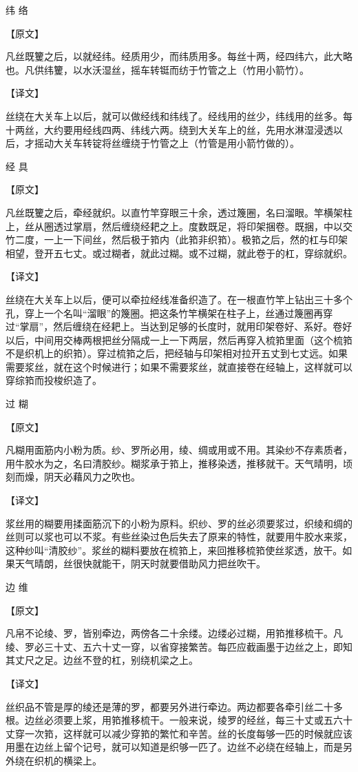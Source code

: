 \documentclass[12pt,UTF8]{ctexbook}
\begin{document}
纬 络

【原文】

凡丝既籰之后，以就经纬。经质用少，而纬质用多。每丝十两，经四纬六，此大略也。凡供纬籰，以水沃湿丝，摇车转铤而纺于竹管之上（竹用小箭竹）。

【译文】

丝绕在大关车上以后，就可以做经线和纬线了。经线用的丝少，纬线用的丝多。每十两丝，大约要用经线四两、纬线六两。绕到大关车上的丝，先用水淋湿浸透以后，才摇动大关车转锭将丝缠绕于竹管之上（竹管是用小箭竹做的）。

经 具

【原文】

凡丝既籰之后，牵经就织。以直竹竿穿眼三十余，透过篾圈，名曰溜眼。竿横架柱上，丝从圈透过掌扇，然后缠绕经耙之上。度数既足，将印架捆卷。既捆，中以交竹二度，一上一下间丝，然后极于筘内（此筘非织筘）。极筘之后，然的杠与印架相望，登开五七丈。或过糊者，就此过糊。或不过糊，就此卷于的杠，穿综就织。

【译文】

丝绕在大关车上以后，便可以牵拉经线准备织造了。在一根直竹竿上钻出三十多个孔，穿上一个名叫“溜眼”的篾圈。把这条竹竿横架在柱子上，丝通过篾圈再穿过“掌扇”，然后缠绕在经耙上。当达到足够的长度时，就用印架卷好、系好。卷好以后，中间用交棒两根把丝分隔成一上一下两层，然后再穿入梳筘里面（这个梳筘不是织机上的织筘）。穿过梳筘之后，把经轴与印架相对拉开五丈到七丈远。如果需要浆丝，就在这个时候进行；如果不需要浆丝，就直接卷在经轴上，这样就可以穿综筘而投梭织造了。

过 糊

【原文】

凡糊用面筋内小粉为质。纱、罗所必用，绫、绸或用或不用。其染纱不存素质者，用牛胶水为之，名曰清胶纱。糊浆承于筘上，推移染透，推移就干。天气晴明，顷刻而燥，阴天必藉风力之吹也。

【译文】

浆丝用的糊要用揉面筋沉下的小粉为原料。织纱、罗的丝必须要浆过，织绫和绸的丝则可以浆也可以不浆。有些丝染过色后失去了原来的特性，就要用牛胶水来浆，这种纱叫“清胶纱”。浆丝的糊料要放在梳筘上，来回推移梳筘使丝浆透，放干。如果天气晴朗，丝很快就能干，阴天时就要借助风力把丝吹干。

边 维

【原文】

凡帛不论绫、罗，皆别牵边，两傍各二十余缕。边缕必过糊，用筘推移梳干。凡绫、罗必三十丈、五六十丈一穿，以省穿接繁苦。每匹应截画墨于边丝之上，即知其丈尺之足。边丝不登的杠，别绕机梁之上。

【译文】

丝织品不管是厚的绫还是薄的罗，都要另外进行牵边。两边都要各牵引丝二十多根。边丝必须要上浆，用筘推移梳干。一般来说，绫罗的经丝，每三十丈或五六十丈穿一次筘，这样就可以减少穿筘的繁忙和辛苦。丝的长度每够一匹的时候就应该用墨在边丝上留个记号，就可以知道是织够一匹了。边丝不必绕在经轴上，而是另外绕在织机的横梁上。
\end{document}

